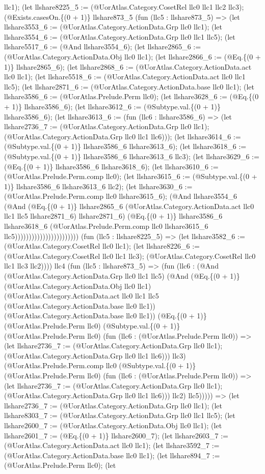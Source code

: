 \documentclass[11pt]{article}
\begin{document}
llc1); (let llshare8225\_5 := (@UorAtlas.Category.CosetRel llc0 llc1 llc2 llc3); (@Exists.casesOn.\{(0 + 1)\} llshare873\_5 (fun (llc5 : llshare873\_5) => (let llshare3553\_6 := (@UorAtlas.Category.ActionData.Grp llc0 llc1); (let llshare3554\_6 := (@UorAtlas.Category.ActionData.Grp llc0 llc1 llc5); (let llshare5517\_6 := (@And llshare3554\_6); (let llshare2865\_6 := (@UorAtlas.Category.ActionData.Obj llc0 llc1); (let llshare2866\_6 := (@Eq.\{(0 + 1)\} llshare2865\_6); (let llshare2868\_6 := (@UorAtlas.Category.ActionData.act llc0 llc1); (let llshare5518\_6 := (@UorAtlas.Category.ActionData.act llc0 llc1 llc5); (let llshare2871\_6 := (@UorAtlas.Category.ActionData.base llc0 llc1); (let llshare3586\_6 := (@UorAtlas.Prelude.Perm llc0); (let llshare3628\_6 := (@Eq.\{(0 + 1)\} llshare3586\_6); (let llshare3612\_6 := (@Subtype.val.\{(0 + 1)\} llshare3586\_6); (let llshare3613\_6 := (fun (llc6 : llshare3586\_6) => (let llshare2736\_7 := (@UorAtlas.Category.ActionData.Grp llc0 llc1); (@UorAtlas.Category.ActionData.Grp llc0 llc1 llc6))); (let llshare3614\_6 := (@Subtype.val.\{(0 + 1)\} llshare3586\_6 llshare3613\_6); (let llshare3618\_6 := (@Subtype.val.\{(0 + 1)\} llshare3586\_6 llshare3613\_6 llc3); (let llshare3629\_6 := (@Eq.\{(0 + 1)\} llshare3586\_6 llshare3618\_6); (let llshare3610\_6 := (@UorAtlas.Prelude.Perm.comp llc0); (let llshare3615\_6 := (@Subtype.val.\{(0 + 1)\} llshare3586\_6 llshare3613\_6 llc2); (let llshare3630\_6 := (@UorAtlas.Prelude.Perm.comp llc0 llshare3615\_6); (@And llshare3554\_6 (@And (@Eq.\{(0 + 1)\} llshare2865\_6 (@UorAtlas.Category.ActionData.act llc0 llc1 llc5 llshare2871\_6) llshare2871\_6) (@Eq.\{(0 + 1)\} llshare3586\_6 llshare3618\_6 (@UorAtlas.Prelude.Perm.comp llc0 llshare3615\_6 llc5))))))))))))))))))))))) (fun (llc5 : llshare8225\_5) => (let llshare3582\_6 := (@UorAtlas.Category.CosetRel llc0 llc1); (let llshare8226\_6 := (@UorAtlas.Category.CosetRel llc0 llc1 llc3); (@UorAtlas.Category.CosetRel llc0 llc1 llc3 llc2)))) llc4 (fun (llc5 : llshare873\_5) => (fun (llc6 : (@And (@UorAtlas.Category.ActionData.Grp llc0 llc1 llc5) (@And (@Eq.\{(0 + 1)\} (@UorAtlas.Category.ActionData.Obj llc0 llc1) (@UorAtlas.Category.ActionData.act llc0 llc1 llc5 (@UorAtlas.Category.ActionData.base llc0 llc1)) (@UorAtlas.Category.ActionData.base llc0 llc1)) (@Eq.\{(0 + 1)\} (@UorAtlas.Prelude.Perm llc0) (@Subtype.val.\{(0 + 1)\} (@UorAtlas.Prelude.Perm llc0) (fun (llc6 : (@UorAtlas.Prelude.Perm llc0)) => (let llshare2736\_7 := (@UorAtlas.Category.ActionData.Grp llc0 llc1); (@UorAtlas.Category.ActionData.Grp llc0 llc1 llc6))) llc3) (@UorAtlas.Prelude.Perm.comp llc0 (@Subtype.val.\{(0 + 1)\} (@UorAtlas.Prelude.Perm llc0) (fun (llc6 : (@UorAtlas.Prelude.Perm llc0)) => (let llshare2736\_7 := (@UorAtlas.Category.ActionData.Grp llc0 llc1); (@UorAtlas.Category.ActionData.Grp llc0 llc1 llc6))) llc2) llc5))))) => (let llshare2736\_7 := (@UorAtlas.Category.ActionData.Grp llc0 llc1); (let llshare8303\_7 := (@UorAtlas.Category.ActionData.Grp llc0 llc1 llc5); (let llshare2600\_7 := (@UorAtlas.Category.ActionData.Obj llc0 llc1); (let llshare2601\_7 := (@Eq.\{(0 + 1)\} llshare2600\_7); (let llshare2603\_7 := (@UorAtlas.Category.ActionData.act llc0 llc1); (let llshare3592\_7 := (@UorAtlas.Category.ActionData.base llc0 llc1); (let llshare894\_7 := (@UorAtlas.Prelude.Perm llc0); (let 
\end{document}

